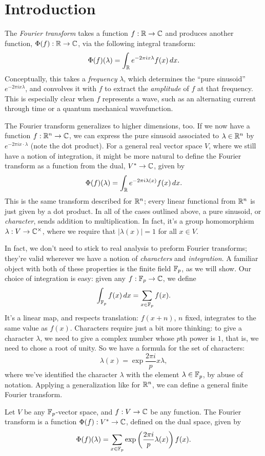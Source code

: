 \section{Introduction}

The \emph{Fourier transform} takes a function $f:\mathbb{R}\to\mathbb{C}$ and produces another
function, $\Phi(f):\mathbb{R}\to\mathbb{C}$, via the following integral transform:
\[ \Phi(f)(\lambda) = \int_{\mathbb{R}} e^{-2\pi i x \lambda} f(x)\, dx. \]
Conceptually, this takes a \emph{frequency} $\lambda$, which determines the ``pure sinusoid''
$e^{-2\pi i x \lambda}$, and convolves it with $f$ to extract the \emph{amplitude} of $f$ 
at that frequency. This is especially clear when $f$ represents a wave, such as an alternating
current through time or a quantum mechanical wavefunction. 

The Fourier transform generalizes to higher dimensions, too. If we now have a function
$f:\mathbb{R}^n\to\mathbb{C}$, we can express the pure sinusoid associated to $\lambda\in\mathbb{R}^n$ by 
$e^{-2\pi i x\cdot\lambda}$ (note the dot product). For a general real vector space $V$, where
we still have a notion of integration, it might be more natural to define the 
Fourier transform as a function from the dual, $V^* \to \mathbb{C}$, given by
\[ \Phi(f)(\lambda) = \int_{\mathbb{R}} e^{-2\pi i \lambda(x)} f(x)\, dx. \]
This is the same transform described for $\mathbb{R}^n$; every linear functional from $\mathbb{R}^n$ is
just given by a dot product. In all of the cases outlined above, a pure sinusoid, or
\emph{character}, sends addition to multiplication. In fact, it's a group homomorphism 
$\lambda:V \to \mathbb{C}^\times$, where we require that $|\lambda(x)| = 1$ for all $x\in V$.

In fact, we don't need to stick to real analysis to preform Fourier transforms; they're
valid wherever we have a notion of \emph{characters}
and \emph{integration}. A familiar object with both of these properties is the finite field
$\mathbb{F}_p$, as we will show. Our choice of integration is easy: given any $f:\mathbb{F}_p\to\mathbb{C}$, we define
\[ \int_{\mathbb{F}_p} f(x)\, dx = \sum_{x\in\mathbb{F}_p} f(x). \]
It's a linear map, and respects translation: $f(x + n)$, $n$ fixed, integrates to the 
same value as $f(x)$. Characters require just a bit more thinking: to give a character 
$\lambda$, we need to give a complex number whose $p$th power is $1$, that is, we need
to chose a root of unity. So we have a formula for the set of characters:
\[ \lambda(x) = \exp {\frac{2\pi i}{p} x \lambda}, \]
where we've identified the character $\lambda$ with the element $\lambda\in\mathbb{F}_p$, by
abuse of notation. Applying a generalization like for $\mathbb{R}^n$, we can define a general
finite Fourier transform.
\begin{defn}
    Let $V$ be any $\mathbb{F}_p$-vector space, and $f:V\to \mathbb{C}$ be any function. The Fourier
    transform is a function $\Phi(f):V^*\to\mathbb{C}$, defined on the dual space, given by
    \[ \Phi(f)(\lambda) = 
        \sum_{x\in\mathbb{F}_p} \exp \left(\frac{2\pi i}{p} \lambda(x)\right) f(x). \]
\end{defn}

